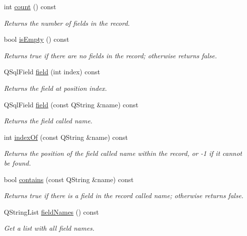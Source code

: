 \begin{DoxyCompactItemize}
int \hyperlink{classmdt_sql_record_a7db54fc3e95195c221a193b083b4b95e}{count} () const 
\begin{DoxyCompactList}\small\item\em Returns the number of fields in the record. \end{DoxyCompactList}\item 
bool \hyperlink{classmdt_sql_record_a2d4e5e0834b9f1c884a117d89a5df31a}{is\-Empty} () const 
\begin{DoxyCompactList}\small\item\em Returns true if there are no fields in the record; otherwise returns false. \end{DoxyCompactList}\item 
Q\-Sql\-Field \hyperlink{classmdt_sql_record_a11c45029e57b56f441ed2ce270212b89}{field} (int index) const 
\begin{DoxyCompactList}\small\item\em Returns the field at position index. \end{DoxyCompactList}\item 
Q\-Sql\-Field \hyperlink{classmdt_sql_record_a6f7071c2a052cbb45e004a706fa8407f}{field} (const Q\-String \&name) const 
\begin{DoxyCompactList}\small\item\em Returns the field called name. \end{DoxyCompactList}\item 
int \hyperlink{classmdt_sql_record_a72e73a47c93453253dde5c2d2938c052}{index\-Of} (const Q\-String \&name) const 
\begin{DoxyCompactList}\small\item\em Returns the position of the field called name within the record, or -\/1 if it cannot be found. \end{DoxyCompactList}\item 
bool \hyperlink{classmdt_sql_record_ab7f694f62b8db947deb9713762ab4f27}{contains} (const Q\-String \&name) const 
\begin{DoxyCompactList}\small\item\em Returns true if there is a field in the record called name; otherwise returns false. \end{DoxyCompactList}\item 
Q\-String\-List \hyperlink{classmdt_sql_record_af6754c9909ef1304ab382303809a7a0a}{field\-Names} () const 
\begin{DoxyCompactList}\small\item\em Get a list with all field names. \end{DoxyCompactList}\item 

\end{DoxyCompactItemize}
